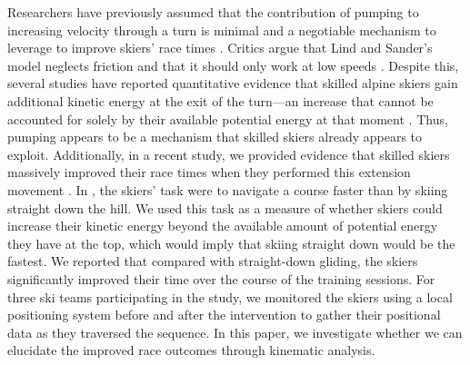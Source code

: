 \documentclass{article}
\begin{document}
Researchers have previously assumed that the contribution of pumping to increasing velocity through a turn is minimal and a negotiable mechanism to leverage to improve skiers' race times \cite{supej_differential_2008}. Critics argue that Lind and Sander's model neglects friction and that it should only work at low speeds \cite{supej_differential_2008, supej_how_2010}. Despite this, several studies have reported quantitative evidence that skilled alpine skiers gain additional kinetic energy at the exit of the turn—an increase that cannot be accounted for solely by their available potential energy at that moment \cite{reid_kinematic_2010, supej_differential_2008, supej_how_2010}. Thus, pumping appears to be a mechanism that skilled skiers already appears to exploit. Additionally, in a recent study, we provided evidence that skilled skiers massively improved their race times when they performed this extension movement \cite{magelssen_is_2022, christian_magelssen_reinforcement_2024}. In \cite{magelssen_is_2022}, the skiers' task were to navigate a course faster than by skiing straight down the hill. We used this task as a measure of whether skiers could increase their kinetic energy beyond the available amount of potential energy they have at the top, which would imply that skiing straight down would be the fastest. We reported that compared with straight-down gliding, the skiers significantly improved their time over the course of the training sessions. For three ski teams participating in the study, we monitored the skiers using a local positioning system before and after the intervention to gather their positional data as they traversed the sequence. In this paper, we investigate whether we can elucidate the improved race outcomes through kinematic analysis. 
\end{document}
